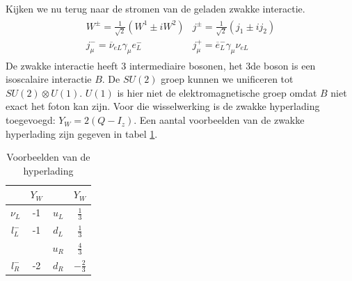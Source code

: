 \documentclass[../main.tex]{subfiles}
\begin{document}
Kijken we nu terug naar de stromen van de geladen zwakke interactie.
\begin{equation}
    \begin{aligned}
        \label{eq:stroom_geladen_zwakke_int}
        \begin{matrix}
            W^\pm = \frac{1}{\sqrt{2}} (W^1\pm iW^2) & j^\pm = \frac{1}{\sqrt{2}} (j_1\pm ij_2) \\
            j_\mu^- = \overline\nu_{eL}\gamma_\mu e_L^- & j_\mu^+ = \overline e_L^-\gamma_\mu\nu_{eL}
        \end{matrix}
    \end{aligned}
\end{equation}
De zwakke interactie heeft 3 intermediaire bosonen, het 3de boson is een isoscalaire interactie $B$. De $SU(2)$ groep kunnen we unificeren tot $SU(2)\otimes U(1)$. $U(1)$ is hier niet de elektromagnetische groep omdat $B$ niet exact het foton kan zijn. Voor die wisselwerking is de zwakke hyperlading toegevoegd: $Y_W = 2(Q-I_z)$. Een aantal voorbeelden van de zwakke hyperlading zijn gegeven in tabel \ref{tab:zwakke_hyperlading}.

\begin{table}[h]
    \centering
    \caption{Voorbeelden van de hyperlading}
    \label{tab:zwakke_hyperlading}
    \begin{tabular}{cccc}
                & $Y_W$ &       & $Y_W$ \\
        \hline
        $\nu_L$ & -1    & $u_L$ & $\frac{1}{3}$\\
        $l_L^-$ & -1    & $d_L$ & $\frac{1}{3}$\\
                &       & $u_R$ & $\frac{4}{3}$\\
        $l_R^-$ & -2    & $d_R$ & $-\frac{2}{3}$\\

    \end{tabular}
\end{table}
\end{document}
